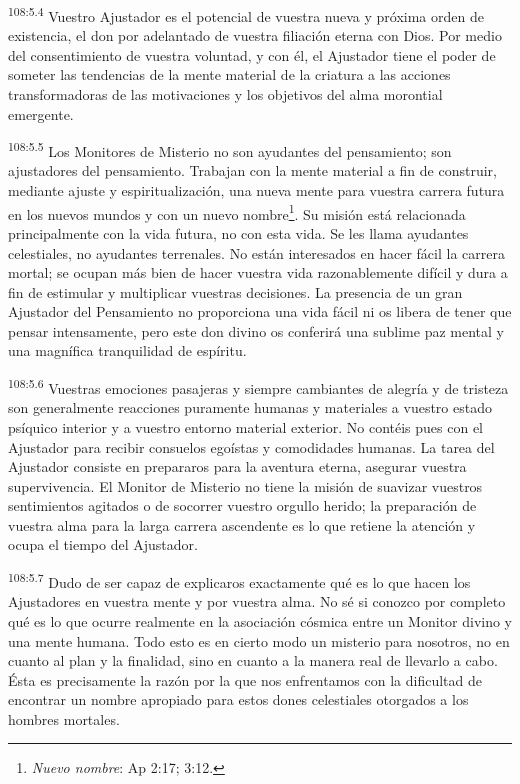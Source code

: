 \documentclass[twoside, 11pt]{book}
\begin{document}
\par
\textsuperscript{108:5.4} Vuestro Ajustador es el potencial de vuestra nueva y próxima orden de existencia, el don por adelantado de vuestra filiación eterna con Dios. Por medio del consentimiento de vuestra voluntad, y con él, el Ajustador tiene el poder de someter las tendencias de la mente material de la criatura a las acciones transformadoras de las motivaciones y los objetivos del alma morontial emergente.

\par
\textsuperscript{108:5.5} Los Monitores de Misterio no son ayudantes del pensamiento; son ajustadores del pensamiento. Trabajan con la mente material a fin de construir, mediante ajuste y espiritualización, una nueva mente para vuestra carrera futura en los nuevos mundos y con un nuevo nombre\footnote{\textit{Nuevo nombre}: Ap 2:17; 3:12.}. Su misión está relacionada principalmente con la vida futura, no con esta vida. Se les llama ayudantes celestiales, no ayudantes terrenales. No están interesados en hacer fácil la carrera mortal; se ocupan más bien de hacer vuestra vida razonablemente difícil y dura a fin de estimular y multiplicar vuestras decisiones. La presencia de un gran Ajustador del Pensamiento no proporciona una vida fácil ni os libera de tener que pensar intensamente, pero este don divino os conferirá una sublime paz mental y una magnífica tranquilidad de espíritu.

\par
\textsuperscript{108:5.6} Vuestras emociones pasajeras y siempre cambiantes de alegría y de tristeza son generalmente reacciones puramente humanas y materiales a vuestro estado psíquico interior y a vuestro entorno material exterior. No contéis pues con el Ajustador para recibir consuelos egoístas y comodidades humanas. La tarea del Ajustador consiste en prepararos para la aventura eterna, asegurar vuestra supervivencia. El Monitor de Misterio no tiene la misión de suavizar vuestros sentimientos agitados o de socorrer vuestro orgullo herido; la preparación de vuestra alma para la larga carrera ascendente es lo que retiene la atención y ocupa el tiempo del Ajustador.

\par
\textsuperscript{108:5.7} Dudo de ser capaz de explicaros exactamente qué es lo que hacen los Ajustadores en vuestra mente y por vuestra alma. No sé si conozco por completo qué es lo que ocurre realmente en la asociación cósmica entre un Monitor divino y una mente humana. Todo esto es en cierto modo un misterio para nosotros, no en cuanto al plan y la finalidad, sino en cuanto a la manera real de llevarlo a cabo. Ésta es precisamente la razón por la que nos enfrentamos con la dificultad de encontrar un nombre apropiado para estos dones celestiales otorgados a los hombres mortales.
\end{document}
